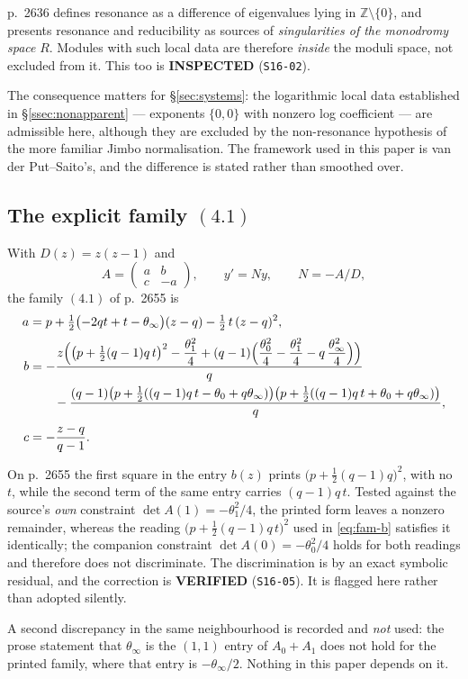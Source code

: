 p.~2636 defines resonance as a difference of eigenvalues lying in
$\mathbb Z\setminus\{0\}$, and presents resonance and reducibility as sources
of \emph{singularities of the monodromy space} $R$. Modules with such local
data are therefore \emph{inside} the moduli space, not excluded from it. This
too is \textbf{INSPECTED} (\texttt{S16-02}).

The consequence matters for \S\ref{sec:systems}: the logarithmic local data
established in \S\ref{ssec:nonapparent} --- exponents $\{0,0\}$ with nonzero
log coefficient --- are admissible here, although they are excluded by the
non-resonance hypothesis of the more familiar Jimbo normalisation. The
framework used in this paper is van der Put--Saito's, and the difference is
stated rather than smoothed over.

\subsection{The explicit family \texorpdfstring{$(4.1)$}{(4.1)}}
\label{ssec:family}

With $D(z)=z(z-1)$ and
\[
  A=\begin{pmatrix} a & b\\ c & -a\end{pmatrix},
  \qquad y'=Ny,\qquad N=-A/D,
\]
the family $(4.1)$ of p.~2655 is
\begin{align}
  a &= p+\tfrac12\bigl(-2qt+t-\theta_\infty\bigr)(z-q)
        -\tfrac12\,t\,(z-q)^2, \label{eq:fam-a}\\[2pt]
  b &= -\frac{z\Bigl(\bigl(p+\tfrac12(q-1)q\,t\bigr)^2-\dfrac{\theta_1^2}{4}
        +(q-1)\Bigl(\dfrac{\theta_0^2}{4}-\dfrac{\theta_1^2}{4}
        -q\,\dfrac{\theta_\infty^2}{4}\Bigr)\Bigr)}{q} \notag\\
    &\qquad -\frac{(q-1)\bigl(p+\tfrac12((q-1)q\,t-\theta_0+q\theta_\infty)\bigr)
        \bigl(p+\tfrac12((q-1)q\,t+\theta_0+q\theta_\infty)\bigr)}{q},
        \label{eq:fam-b}\\[2pt]
  c &= -\frac{z-q}{q-1}. \label{eq:fam-c}
\end{align}

\begin{remark}\label{rem:typo}
On p.~2655 the first square in the entry $b(z)$ prints
$\bigl(p+\tfrac12(q-1)q\bigr)^2$, with no $t$, while the second term of the
same entry carries $(q-1)q\,t$. Tested against the source's \emph{own}
constraint $\det A(1)=-\theta_1^2/4$, the printed form leaves a nonzero
remainder, whereas the reading $\bigl(p+\tfrac12(q-1)q\,t\bigr)^2$ used in
\eqref{eq:fam-b} satisfies it identically; the companion constraint
$\det A(0)=-\theta_0^2/4$ holds for both readings and therefore does not
discriminate. The discrimination is by an exact symbolic residual, and the
correction is \textbf{VERIFIED} (\texttt{S16-05}). It is flagged here rather
than adopted silently.

A second discrepancy in the same neighbourhood is recorded and \emph{not}
used: the prose statement that $\theta_\infty$ is the $(1,1)$ entry of
$A_0+A_1$ does not hold for the printed family, where that entry is
$-\theta_\infty/2$. Nothing in this paper depends on it.
\end{remark}


